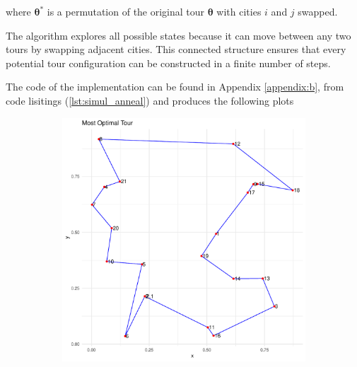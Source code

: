 where \( \boldsymbol{\theta}^{*} \) is a permutation of the original tour \( \boldsymbol{\theta} \) with cities \( i \) and \( j \) swapped. 

The algorithm explores all possible states because it can move between any two tours by swapping adjacent cities. This connected structure ensures that every potential tour configuration can be constructed in a finite number of steps.

The code of the implementation can be found in Appendix \ref{appendix:b}, from code lisitings (\ref{lst:simul_anneal}) and produces the following plots 
\begin{figure}[H]
  \centering
  \begin{subfigure}{0.48\textwidth}
    \centering
    \includegraphics[width=\linewidth]{Images/Figures_Exercise_4/opt_annealing.pdf} %
    \caption{}
    \label{fig:opt_annealing}
  \end{subfigure}
  \hfill
  \begin{subfigure}{0.48\textwidth}
    \centering

\end{subfigure}
\end{figure}
